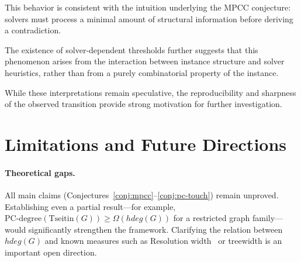 \documentclass[11pt,a4paper]{article}
\def\hdeg{hdeg}%
\theoremstyle{remark}
\newcommand{\hdeg}{\widehat{\deg}}
\begin{document}
This behavior is consistent with the intuition underlying the MPCC conjecture:
solvers must process a minimal amount of structural information before deriving a contradiction.

The existence of solver-dependent thresholds further suggests that this phenomenon
arises from the interaction between instance structure and solver heuristics,
rather than from a purely combinatorial property of the instance.

While these interpretations remain speculative, the reproducibility and sharpness
of the observed transition provide strong motivation for further investigation.

\section{Limitations and Future Directions}

\paragraph{Theoretical gaps.}
All main claims (Conjectures~\ref{conj:mpcc}--\ref{conj:pc-touch}) remain unproved.
Establishing even a partial result---for example,
$\mathrm{PC\text{-}degree}(\mathrm{Tseitin}(G)) \geq \Omega(\hdeg(G))$
for a restricted graph family---would significantly strengthen the framework.
Clarifying the relation between $\hdeg(G)$ and known measures such as Resolution
width~\cite{BenSassonWigderson2001} or treewidth is an important open direction.
\end{document}
